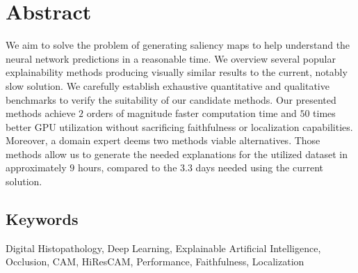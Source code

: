 \chapter*{Abstract}

We aim to solve the problem of generating saliency maps to help understand the neural network predictions in a reasonable time.
We overview several popular explainability methods producing visually similar results to the current, notably slow solution.
We carefully establish exhaustive quantitative and qualitative benchmarks to verify the suitability of our candidate methods.
Our presented methods achieve $2$ orders of magnitude faster computation time and $50$ times better GPU utilization without sacrificing faithfulness or localization capabilities.
Moreover, a domain expert deems two methods viable alternatives.
Those methods allow us to generate the needed explanations for the utilized dataset in approximately $9$ hours, compared to the $3.3$ days needed using the current solution.

\section*{Keywords}
Digital Histopathology, Deep Learning, Explainable Artificial Intelligence, Occlusion, CAM, HiResCAM, Performance, Faithfulness, Localization
